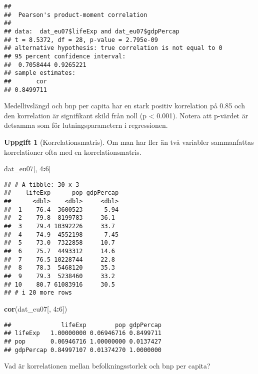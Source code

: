 \documentclass[
]{book}
\newenvironment{Shaded}{\begin{snugshade}}{\end{snugshade}}
\newcommand{\DecValTok}[1]{\textcolor[rgb]{0.00,0.00,0.81}{#1}}
\newcommand{\FunctionTok}[1]{\textcolor[rgb]{0.13,0.29,0.53}{\textbf{#1}}}
\newcommand{\NormalTok}[1]{#1}
\newcommand{\SpecialCharTok}[1]{\textcolor[rgb]{0.81,0.36,0.00}{\textbf{#1}}}
\theoremstyle{definition}
\theoremstyle{definition}
\theoremstyle{definition}
\newtheorem{exercise}{Uppgift}[chapter]
\theoremstyle{definition}
\theoremstyle{remark}
\begin{document}
\begin{Shaded}
\end{Shaded}

\begin{verbatim}
## 
##  Pearson's product-moment correlation
## 
## data:  dat_eu07$lifeExp and dat_eu07$gdpPercap
## t = 8.5372, df = 28, p-value = 2.795e-09
## alternative hypothesis: true correlation is not equal to 0
## 95 percent confidence interval:
##  0.7058444 0.9265221
## sample estimates:
##       cor 
## 0.8499711
\end{verbatim}

Medellivslängd och bnp per capita har en stark positiv korrelation på 0.85 och den korrelation är signifikant skild från noll (p \textless{} 0.001). Notera att p-värdet är detsamma som för lutningsparametern i regressionen.

\begin{exercise}[Korrelationsmatris]
Om man har fler än två variabler sammanfattas korrelationer ofta med en korrelationsmatris.

\begin{Shaded}
\begin{Highlighting}[]
\NormalTok{dat\_eu07[, }\DecValTok{4}\SpecialCharTok{:}\DecValTok{6}\NormalTok{]}
\end{Highlighting}
\end{Shaded}

\begin{verbatim}
## # A tibble: 30 x 3
##    lifeExp      pop gdpPercap
##      <dbl>    <dbl>     <dbl>
##  1    76.4  3600523      5.94
##  2    79.8  8199783     36.1 
##  3    79.4 10392226     33.7 
##  4    74.9  4552198      7.45
##  5    73.0  7322858     10.7 
##  6    75.7  4493312     14.6 
##  7    76.5 10228744     22.8 
##  8    78.3  5468120     35.3 
##  9    79.3  5238460     33.2 
## 10    80.7 61083916     30.5 
## # i 20 more rows
\end{verbatim}

\begin{Shaded}
\begin{Highlighting}[]
\FunctionTok{cor}\NormalTok{(dat\_eu07[, }\DecValTok{4}\SpecialCharTok{:}\DecValTok{6}\NormalTok{])}
\end{Highlighting}
\end{Shaded}

\begin{verbatim}
##              lifeExp        pop gdpPercap
## lifeExp   1.00000000 0.06946716 0.8499711
## pop       0.06946716 1.00000000 0.0137427
## gdpPercap 0.84997107 0.01374270 1.0000000
\end{verbatim}

Vad är korrelationen mellan befolkningsstorlek och bnp per capita?
\end{exercise}
\end{document}

